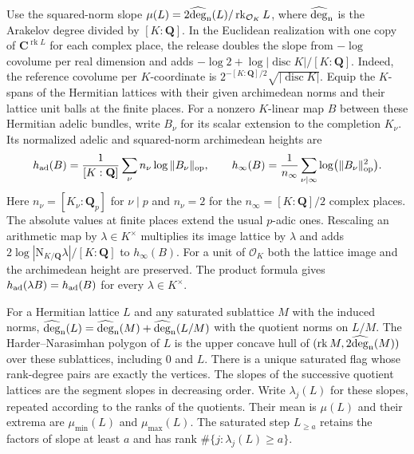 Use the squared-norm slope
\(\mu(L)=2\widehat{\deg}_{\rm n}(L)/\operatorname{rk}_{\mathcal O_K}L\),
where \(\widehat{\deg}_{\rm n}\) is the Arakelov degree divided by
\([K:\mathbf Q]\). In the Euclidean realization with one copy of
\(\mathbf C^{\operatorname{rk}L}\) for each complex place, the
release doubles the slope from \(-\log\) covolume per real dimension
and adds \(-\log 2+\log|\operatorname{disc}K|/[K:\mathbf Q]\).
Indeed, the reference covolume per \(K\)-coordinate is
\(2^{-[K:\mathbf Q]/2}\sqrt{|\operatorname{disc}K|}\).
Equip the \(K\)-spans of the Hermitian lattices
with their given archimedean norms and their lattice unit balls at the
finite places. For a nonzero \(K\)-linear map \(B\) between these
Hermitian adelic bundles, write \(B_\nu\) for its scalar extension to
the completion \(K_\nu\). Its normalized adelic and squared-norm
archimedean heights are
\[
  h_{\rm ad}(B)=\frac{1}{[K:\mathbf Q]}
       \sum_\nu n_\nu\log\|B_\nu\|_{\mathrm{op}},
  \qquad
  h_\infty(B)=\frac{1}{n_\infty}
       \sum_{\nu\mid\infty}\log\bigl(\|B_\nu\|_{\mathrm{op}}^2\bigr).
\]
Here \(n_\nu=[K_\nu:\mathbf Q_p]\) for \(\nu\mid p\) and
\(n_\nu=2\) for the \(n_\infty=[K:\mathbf Q]/2\) complex places.
The absolute values at finite places extend the usual \(p\)-adic ones.
\cite[Definition~6.1, arXiv version]{rk3gaudron}
\cite[Equation~(20), p.~34]{tr3chenHN}
Rescaling an arithmetic map by \(\lambda\in K^\times\) multiplies its
image lattice by \(\lambda\) and adds
\(2\log|\mathrm{N}_{K/\mathbf Q}\lambda|/[K:\mathbf Q]\)
to \(h_\infty(B)\). For a unit of \(\mathcal O_K\) both the lattice image
and the archimedean height are preserved. The product formula gives
\(h_{\rm ad}(\lambda B)=h_{\rm ad}(B)\) for every \(\lambda\in K^\times\).

For a Hermitian lattice \(L\) and any saturated sublattice \(M\) with
the induced norms, \(\widehat{\deg}_{\rm n}(L)=
\widehat{\deg}_{\rm n}(M)+\widehat{\deg}_{\rm n}(L/M)\) with the
quotient norms on \(L/M\).
The Harder--Narasimhan polygon of \(L\) is the upper
concave hull of \((\operatorname{rk}M,2\widehat{\deg}_{\rm n}(M))\)
over these sublattices, including \(0\) and \(L\).
There is a unique saturated flag whose rank-degree pairs are exactly
the vertices. The slopes of the successive quotient lattices are the
segment slopes in decreasing order.
\cite[Propositions~4.22 and~5.13, arXiv version]{rk3gaudron}
Write \(\lambda_j(L)\) for these slopes, repeated according to the
ranks of the quotients. Their mean is \(\mu(L)\) and their extrema
are \(\mu_{\min}(L)\) and \(\mu_{\max}(L)\).
The saturated step \(L_{\ge a}\) retains the factors of slope at least
\(a\) and has rank \(\#\{j:\lambda_j(L)\ge a\}\).

